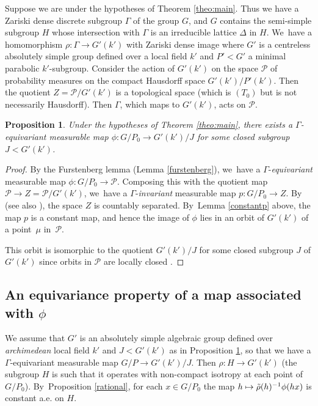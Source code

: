 \documentclass[JEP,XML,SOM,Unicode,published]{cedram}
\def\mto{\mathchoice{\longmapsto}{\mapsto}{\mapsto}{\mapsto}}
\newtheorem{proposition}[theorem]{Proposition}
\theoremstyle{definition}
\let\D\Delta
\let\G\Gamma
\begin{document}
Suppose we are under the hypotheses of Theorem \ref{theo:main}. Thus we have a Zariski dense discrete subgroup $\G$ of the group $G$, and $G$ contains the semi-simple subgroup $H$ whose intersection with $\G$ is an irreducible lattice $\D$
in $H$. We~have a homomorphism $\rho: \G \to G'(k')$ with Zariski dense image where $G'$ is a centreless absolutely simple group defined over a local field $k'$ and $P'<G'$ a minimal parabolic $k'$-subgroup. Consider the action of $G'(k')$ on the space $\mathcal P$ of probability measures on the compact Hausdorff space $G'(k')/P'(k')$. Then the quotient $Z=\mathcal{P}/G'(k')$ is a topological space (which is $(T_0)$ but is not necessarily Hausdorff). Then $\G$, which maps to $G'(k')$, acts on $\mathcal P$.

\begin{proposition} \label{oneorbit} Under the hypotheses of Theorem \ref{theo:main}, there exists a $\G$-equivariant measurable map $\phi: G/P_0 \to G'(k')/J$ for some closed subgroup $J< G'(k')$.
\end{proposition}

\begin{proof} By the Furstenberg lemma (Lemma \ref{furstenberg}), we~have a $\G$-\emph{equivariant} measurable map $\phi : G/P_0 \to \mathcal{P}$. Composing this with the quotient map $\mathcal{P} \to Z=\mathcal{P}/G'(k')$, we~have a $\G$-\emph{invariant} measurable map $p: G/P_0 \to Z$. By~\cite[Cor.\,(3.2.17)]{Z} (see also \cite[(2.1.9)]{Z}), the space $Z$ is countably separated. By~Lemma \ref{constantp} above, the map $p$ is a constant map, and hence the image of $\phi $ lies in an orbit of $G'(k')$ of a point~$\mu $ in~$\mathcal P$.

This orbit is isomorphic to the quotient $G'(k')/J$ for some closed subgroup $J$ of $G'(k')$ since orbits in $\mathcal P$ are locally closed \cite[Prop.\,(2.1.10) \& Cor.\,(3.2.17)]{Z}.
\end{proof}

\subsection{An equivariance property of a map associated with $\phi$}

We assume that $G'$ is an absolutely simple algebraic group defined over \emph{archimedean} local field $k'$ and $J<G'(k')$ as in Proposition \ref{oneorbit}, so that we have a $\G$-equivariant measurable map $G/P \to G'(k')/J$. Then $\rho : H \to G'(k')$ (the subgroup $H$ is such that it operates with non-compact isotropy at each point of $G/P_0$). By~Proposition \ref{rational}, for each $x\in G/P_0$ the map $h\mto \tilde \rho (h)^{-1}\phi (hx)$ is constant a.e. on $H$.
\end{document}
